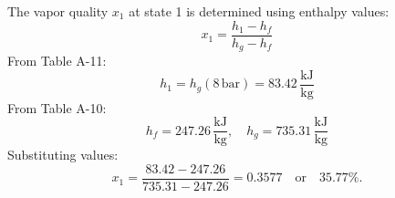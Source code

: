 The vapor quality \( x_1 \) at state 1 is determined using enthalpy values:  
\[
x_1 = \frac{h_1 - h_f}{h_g - h_f}
\]  
From Table A-11:  
\[
h_1 = h_g(8 \, \text{bar}) = 83.42 \, \frac{\text{kJ}}{\text{kg}}
\]  
From Table A-10:  
\[
h_f = 247.26 \, \frac{\text{kJ}}{\text{kg}}, \quad h_g = 735.31 \, \frac{\text{kJ}}{\text{kg}}
\]  
Substituting values:  
\[
x_1 = \frac{83.42 - 247.26}{735.31 - 247.26} = 0.3577 \quad \text{or} \quad 35.77\%.
\]